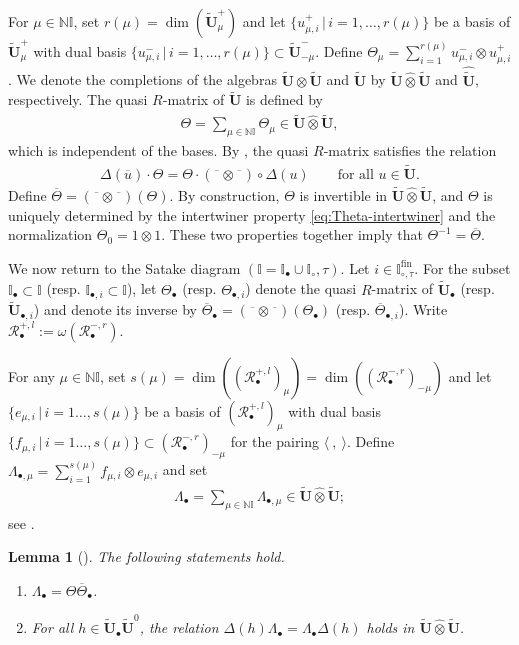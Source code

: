 \documentclass[a4paper,reqno,12pt]{amsart}
\numberwithin{equation}{section}
\newtheorem{lemma}[proposition]{Lemma}
\theoremstyle{definition}
\theoremstyle{plain}
\theoremstyle{definition}
\def\N{\mathbb N}
\def\I{\mathbb I}
\def\bI{\I_\bullet}
\def\bIi{\I_{\bullet,i}}
\def\tU{\widetilde{\mathbf U}}
\def \tbU{\tU_{\bullet}}
\def \tbiU{\tU_{\bullet,i}}
\def\cR{\mathcal R}
\def \ov{\overline}
\def \wItau{\I_{\circ,\tau}}
\def \fwItau{\wItau^{\mathrm{fin}}}
\newcommand{\obar}{\overline{\phantom{o}}}
\begin{document}
For $\mu\in \N\I$, set $r(\mu)=\dim(\tU^+_\mu)$ and let $\{u^+_{\mu,i}\,|\,i=1,\dots,r(\mu)\}$ be a basis of $\tU^+_\mu$ with dual basis $\{u^-_{\mu,i}\,|\,i=1,\dots,r(\mu)\}\subset \tU^-_{-\mu}$. Define $\Theta_\mu=\sum_{i=1}^{r(\mu)} u^-_{\mu,i}\otimes u^+_{\mu,i}$. We denote the completions of the algebras $\tU\otimes\tU$ and $\tU$ by $\tU \widehat{\otimes} \tU$ and $\widehat{\tU}$, respectively. The quasi $R$-matrix of $\tU$ is defined by
\begin{align}\label{eq:Theta-def}
  \Theta=\sum_{\mu\in \N\I} \Theta_\mu\in\tU \widehat{\otimes} \tU,
\end{align}
which is independent of the bases.
By \cite[Theorem 4.1.2]{Lus93}, the quasi $R$-matrix satisfies the relation
\begin{align}\label{eq:Theta-intertwiner}
  \Delta(\overline{u})\cdot \Theta=\Theta\cdot (\obar \otimes \obar)\circ\Delta(u) \qquad \text{for all $u\in \tU$.}
\end{align}  
 Define $\overline{\Theta}=(\obar\otimes\obar)(\Theta)$. By construction, $\Theta$ is invertible in $\tU \widehat{\otimes} \tU$, and $\Theta$ is uniquely determined by the intertwiner property \eqref{eq:Theta-intertwiner} and the normalization $\Theta_0=1\otimes 1$. These two properties together imply that $\Theta^{-1}=\overline{\Theta}$.

We now return to the Satake diagram $(\I=\I_\bullet\cup\I_\circ,\tau)$. Let $i\in\fwItau$. For the subset $\bI\subset\I$ (resp. $\bIi\subset\I$), let $\Theta_\bullet$ (resp. $\Theta_{\bullet,i}$)  denote the quasi $R$-matrix of $\tbU$ (resp. $\tbiU$) and denote its inverse by $\ov{\Theta}_\bullet=(\obar\otimes\obar)(\Theta_\bullet)$ (resp. $\ov\Theta_{\bullet,i}$). Write $\cR_\bullet^{+,l}:=\omega(\cR_\bullet^{-,r})$.

For any $\mu\in \N\I$, set $s(\mu)=\dim((\cR_\bullet^{+,l})_\mu)=\dim((\cR_\bullet^{-,r})_{-\mu})$ and let $\{e_{\mu,i}\,|\,i=1\dots,s(\mu)\}$ be a basis of $(\cR_\bullet^{+,l})_\mu$ with dual basis $\{f_{\mu,i}\,|\,i=1\dots,s(\mu)\}\subset(\cR_\bullet^{-,r})_{-\mu}$ for the pairing $\langle\ ,\ \rangle$. Define $\Lambda_{\bullet,\mu}=\sum_{i=1}^{s(\mu)} f_{\mu,i}\otimes e_{\mu,i}$ and set
\begin{align*}
  \Lambda_\bullet=\sum_{\mu\in \N\I} \Lambda_{\bullet,\mu}\in \tU \widehat{\otimes} \tU;
\end{align*} 
see \cite[\S 5.2]{KY26}.

\begin{lemma}[{\cite[Lemma 5.4]{KY26}}]\label{lem:rel-quasi} The following statements hold.
  \begin{enumerate}
    \item $\Lambda_\bullet=\Theta \overline{\Theta}_\bullet$.
    \item For all $h\in \tbU\tU^0$, the relation $\Delta(h)\Lambda_\bullet=\Lambda_\bullet \Delta(h)$
      holds in $\tU \widehat{\otimes} \tU$.
  \end{enumerate}  
\end{lemma}
\end{document}
